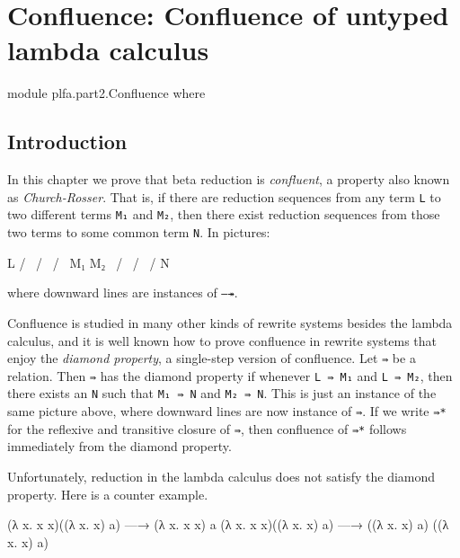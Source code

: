 \hypertarget{Confluence}{%
\chapter{Confluence: Confluence of untyped lambda
calculus}\label{Confluence}}

\begin{fence}
\begin{code}
module plfa.part2.Confluence where
\end{code}
\end{fence}

\hypertarget{introduction}{%
\section{Introduction}\label{introduction}}

In this chapter we prove that beta reduction is \emph{confluent}, a
property also known as \emph{Church-Rosser}. That is, if there are
reduction sequences from any term \texttt{L} to two different terms
\texttt{M₁} and \texttt{M₂}, then there exist reduction sequences from
those two terms to some common term \texttt{N}. In pictures:

\begin{myDisplay}
    L
   / \
  /   \
 /     \
M₁      M₂
 \     /
  \   /
   \ /
    N
\end{myDisplay}

where downward lines are instances of \texttt{—↠}.

Confluence is studied in many other kinds of rewrite systems besides the
lambda calculus, and it is well known how to prove confluence in rewrite
systems that enjoy the \emph{diamond property}, a single-step version of
confluence. Let \texttt{⇛} be a relation. Then \texttt{⇛} has the
diamond property if whenever \texttt{L\ ⇛\ M₁} and \texttt{L\ ⇛\ M₂},
then there exists an \texttt{N} such that \texttt{M₁\ ⇛\ N} and
\texttt{M₂\ ⇛\ N}. This is just an instance of the same picture above,
where downward lines are now instance of \texttt{⇛}. If we write
\texttt{⇛*} for the reflexive and transitive closure of \texttt{⇛}, then
confluence of \texttt{⇛*} follows immediately from the diamond property.

Unfortunately, reduction in the lambda calculus does not satisfy the
diamond property. Here is a counter example.

\begin{myDisplay}
(λ x. x x)((λ x. x) a) —→ (λ x. x x) a
(λ x. x x)((λ x. x) a) —→ ((λ x. x) a) ((λ x. x) a)
\end{myDisplay}


